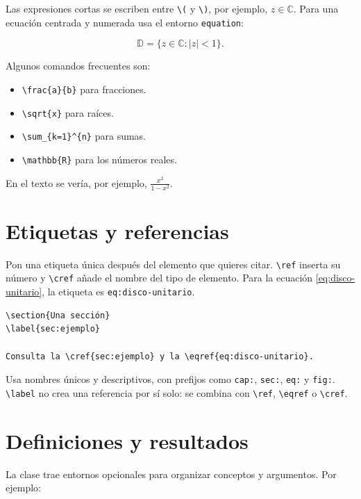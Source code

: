 Las expresiones cortas se escriben entre \verb|\(| y \verb|\)|, por ejemplo, \(z\in\mathbb{C}\). Para una ecuación centrada y numerada usa el entorno \verb|equation|:

\begin{equation}
  \mathbb{D}=\{z\in\mathbb{C}:|z|<1\}.
  \label{eq:disco-unitario}
\end{equation}

Algunos comandos frecuentes son:

\begin{itemize}
  \item \verb|\frac{a}{b}| para fracciones.
  \item \verb|\sqrt{x}| para raíces.
  \item \verb|\sum_{k=1}^{n}| para sumas.
  \item \verb|\mathbb{R}| para los números reales.
\end{itemize}

En el texto se vería, por ejemplo, \(\frac{x^2}{1-x^2}\).

\section{Etiquetas y referencias}

Pon una etiqueta única después del elemento que quieres citar. \verb|\ref| inserta su número y \verb|\cref| añade el nombre del tipo de elemento. Para la ecuación \cref{eq:disco-unitario}, la etiqueta es \verb|eq:disco-unitario|.

\begin{verbatim}
\section{Una sección}
\label{sec:ejemplo}

Consulta la \cref{sec:ejemplo} y la \eqref{eq:disco-unitario}.
\end{verbatim}

Usa nombres únicos y descriptivos, con prefijos como \verb|cap:|, \verb|sec:|, \verb|eq:| y \verb|fig:|. \verb|\label| no crea una referencia por sí solo: se combina con \verb|\ref|, \verb|\eqref| o \verb|\cref|.

\section{Definiciones y resultados}

La clase trae entornos opcionales para organizar conceptos y argumentos. Por ejemplo:

